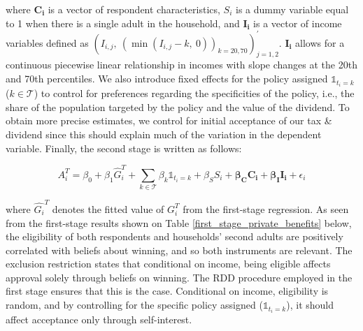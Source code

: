 \documentclass[12pt]{article} %
\newcommand{\un}{\mathds{1}} %
\begin{document}
\noindent %
where $\mathbf{C_i}$ is a vector of respondent characteristics, $S_i$ is a dummy variable equal to 1 when there is a single adult in the household, and $\mathbf{I_i}$ is a vector of income variables defined as $\left(I_{i,j},\:\left(\min(I_{i,j}-k,\:0)\right)_{k=20,70}\right)^{\prime}_{j=1,2}$. $\mathbf{I_i}$ allows for a continuous piecewise linear relationship in incomes with slope changes at the 20th and 70th percentiles. We also introduce fixed effects for the policy assigned $\un_{t_i=k}$ ($k\in \mathcal{T}$) to control for preferences regarding the specificities of the policy, i.e., the share of the population targeted by the policy and the value of the dividend. To obtain more precise estimates, we control for initial acceptance of our tax \& dividend since this should explain much of the variation in the dependent variable. Finally, the second stage is written as follows:


\noindent

\begin{equation}
    A_i^T = \beta_0 + \beta_1 \widehat{G}_i^T + \sum_{k\in\mathcal{T}} \beta_k \un_{t_i=k} + \beta_S S_i + \mathbf{\beta_C C_i} + \mathbf{\beta_I I_i} + \epsilon_i
    \label{eq:second_stage_with_rdd_approve_winner}
\end{equation}

\medskip


\noindent
where $\widehat{G_i}^T$ denotes the fitted value of $G_i^T$ from the first-stage regression. As seen from the first-stage results shown on Table \ref{first_stage_private_benefits} below, the eligibility of both respondents and households' second adults are positively correlated with beliefs about winning, and so both instruments are relevant. The exclusion restriction states that conditional on income, being eligible affects approval solely through beliefs on winning. The RDD procedure employed in the first stage ensures that this is the case. Conditional on income, eligibility is random, and by controlling for the specific policy assigned ($\un_{t_i=k}$), it should affect acceptance only through self-interest. 
\end{document}
